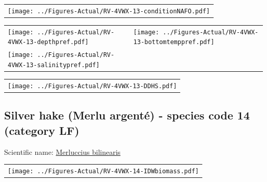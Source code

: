 \documentclass[12pt]{article}\usepackage[]{graphicx}\usepackage[]{color}
\begin{document}
\vspace{1cm}
\begin{minipage}{1.0\textwidth}
 \begin{tabular}{c}
\texttt{[image: ../Figures-Actual/RV-4VWX-13-conditionNAFO.pdf]} \\ 
\end{tabular} 
\end{minipage}
\clearpage
\begin{minipage}{1.0\textwidth}
 \begin{tabular}[t]{m{3in}m{3in}}
\texttt{[image: ../Figures-Actual/RV-4VWX-13-depthpref.pdf]} & 
\texttt{[image: ../Figures-Actual/RV-4VWX-13-bottomtemppref.pdf]} \\ 
\texttt{[image: ../Figures-Actual/RV-4VWX-13-salinitypref.pdf]} & 
 \\ 
\end{tabular} 
\end{minipage}
\newline

\vspace{1cm}
\begin{minipage}{1.0\textwidth}
 \begin{tabular}{c}
\texttt{[image: ../Figures-Actual/RV-4VWX-13-DDHS.pdf]} \\ 
\end{tabular} 
\end{minipage}
\clearpage

\renewcommand\thefigure{\thesubsection\Alph{figure}}

\setcounter{figure}{0}

\hypertarget{sec:14}{%
\subsection{Silver hake (Merlu argenté) - species code 14 (category LF)}\label{sec:14}}

  


Scientific name: \href{http://www.marinespecies.org/aphia.php?p=taxdetails\&id=158962}{Merluccius bilinearis} \newline
\begin{minipage}{1.0\textwidth}
 \begin{tabular}{c}
\texttt{[image: ../Figures-Actual/RV-4VWX-14-IDWbiomass.pdf]} \\ 
\end{tabular} 
\end{minipage}
\newline
\end{document}
